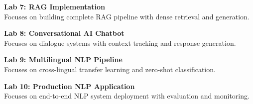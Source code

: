 \vspace{0.2cm}

\noindent\textbf{Lab 7: RAG Implementation} \\
Focuses on building complete RAG pipeline with dense retrieval and generation.

\vspace{0.2cm}

\noindent\textbf{Lab 8: Conversational AI Chatbot} \\
Focuses on dialogue systems with context tracking and response generation.

\vspace{0.2cm}

\noindent\textbf{Lab 9: Multilingual NLP Pipeline} \\
Focuses on cross-lingual transfer learning and zero-shot classification.

\vspace{0.2cm}

\noindent\textbf{Lab 10: Production NLP Application} \\
Focuses on end-to-end NLP system deployment with evaluation and monitoring.

\vspace{0.2cm}

\newpage
{}
